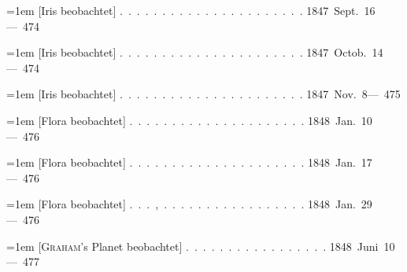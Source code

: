 \noindent\hangindent=1em [Iris beobachtet] \mbox{.\ .\ .\ .\ .\ .\ .\ .\ .\ .\ .\ .\ .\ .\ .\ .\ .\ .\ .\ .\ .\ .} \hfill\mbox{1847 Sept. 16}\quad\mbox{--- 474}\par\smallskip
\noindent\hangindent=1em [Iris beobachtet] \mbox{.\ .\ .\ .\ .\ .\ .\ .\ .\ .\ .\ .\ .\ .\ .\ .\ .\ .\ .\ .\ .\ .} \hfill\mbox{1847 Octob. 14}\quad\mbox{--- 474}\par\smallskip
\noindent\hangindent=1em [Iris beobachtet] \mbox{.\ .\ .\ .\ .\ .\ .\ .\ .\ .\ .\ .\ .\ .\ .\ .\ .\ .\ .\ .\ .\ .} \hfill\mbox{1847 Nov. 8}\quad\mbox{--- 475}\par\smallskip
\noindent\hangindent=1em [Flora beobachtet] \mbox{.\ .\ .\ .\ .\ .\ .\ .\ .\ .\ .\ .\ .\ .\ .\ .\ .\ .\ .\ .\ .} \hfill\mbox{1848 Jan. 10}\quad\mbox{--- 476}\par\smallskip
\noindent\hangindent=1em [Flora beobachtet] \mbox{.\ .\ .\ .\ .\ .\ .\ .\ .\ .\ .\ .\ .\ .\ .\ .\ .\ .\ .\ .\ .} \hfill\mbox{1848 Jan. 17}\quad\mbox{--- 476}\par\smallskip
\noindent\hangindent=1em [Flora beobachtet] \mbox{.\ .\ .\ ,\ .\ .\ .\ .\ .\ .\ .\ .\ .\ .\ .\ .\ .\ .\ .\ .\ .} \hfill\mbox{1848 Jan. 29}\quad\mbox{--- 476}\par\smallskip
\noindent\hangindent=1em [\textsc{Graham}'s Planet beobachtet] \mbox{.\ .\ .\ .\ .\ .\ .\ .\ .\ .\ .\ .\ .\ .\ .\ .\ .} \hfill\mbox{1848 Juni 10}\quad\mbox{--- 477}\par\smallskip
\endgroup
